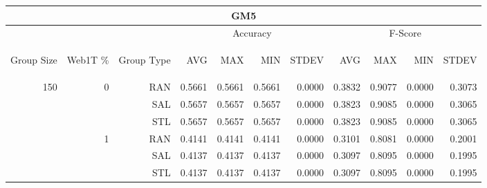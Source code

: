 \begin{center}
\begin{table}[htbp] 
 \begin{center}
\begin{tabular}{ | r | r | r | r | r | r | r | r | r | r | r |}
\hline
\multicolumn{11}{|c|}{GM5}\\
\hline
 & & & \multicolumn{4}{|c|}{Accuracy} & \multicolumn{4}{|c|}{F-Score}\\ \cline{4-11}
\begin{sideways}Group Size\end{sideways} & \begin{sideways}Web1T \%\end{sideways} & \begin{sideways}Group Type\end{sideways} & \begin{sideways}AVG\end{sideways} & \begin{sideways}MAX\end{sideways} & \begin{sideways}MIN\end{sideways} & \begin{sideways}STDEV\end{sideways} & \begin{sideways}AVG\end{sideways} & \begin{sideways}MAX\end{sideways} & \begin{sideways}MIN\end{sideways} & \begin{sideways}STDEV\end{sideways}\\
\hline
\multirow{18}{*}{150}
 & \multirow{3}{*}{0} & RAN & 0.5661 & 0.5661 & 0.5661 & 0.0000 & 0.3832 & 0.9077 & 0.0000 & 0.3073\\ \cline{3-11}
 &   & SAL & 0.5657 & 0.5657 & 0.5657 & 0.0000 & 0.3823 & 0.9085 & 0.0000 & 0.3065\\ \cline{3-11}
 &   & STL & 0.5657 & 0.5657 & 0.5657 & 0.0000 & 0.3823 & 0.9085 & 0.0000 & 0.3065\\ \cline{2-11}
 & \multirow{3}{*}{1} & RAN & 0.4141 & 0.4141 & 0.4141 & 0.0000 & 0.3101 & 0.8081 & 0.0000 & 0.2001\\ \cline{3-11}
 &   & SAL & 0.4137 & 0.4137 & 0.4137 & 0.0000 & 0.3097 & 0.8095 & 0.0000 & 0.1995\\ \cline{3-11}
 &   & STL & 0.4137 & 0.4137 & 0.4137 & 0.0000 & 0.3097 & 0.8095 & 0.0000 & 0.1995\\ \cline{2-11}

\end{tabular}
\end{center}
\end{table}
\end{center}
